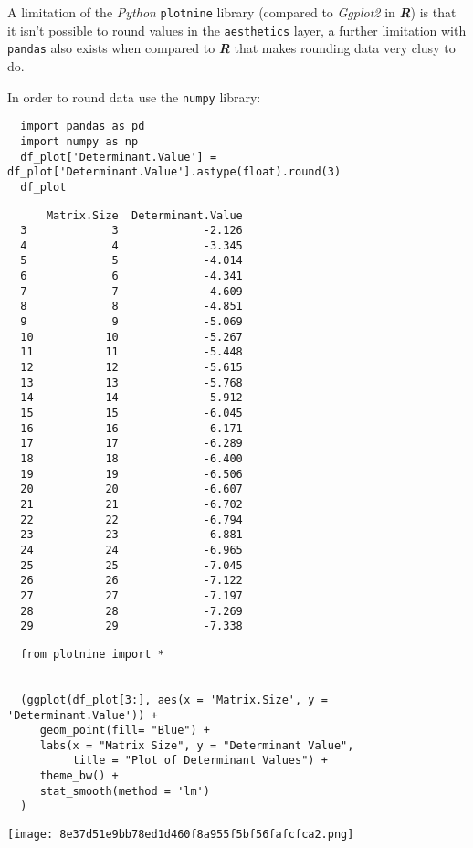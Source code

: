 \documentclass[11pt]{article}
\begin{document}
A limitation of the \emph{Python} \texttt{plotnine} library (compared to \emph{Ggplot2}
in \textbf{\emph{R}}) is that it isn't possible to round values in the \texttt{aesthetics}
layer, a further limitation with \texttt{pandas} also exists when compared to
\textbf{\emph{R}} that makes rounding data very clusy to do.

In order to round data use the \texttt{numpy} library:

\begin{verbatim}
  import pandas as pd
  import numpy as np
  df_plot['Determinant.Value'] = df_plot['Determinant.Value'].astype(float).round(3)
  df_plot
\end{verbatim}

\begin{verbatim}
      Matrix.Size  Determinant.Value
  3             3             -2.126
  4             4             -3.345
  5             5             -4.014
  6             6             -4.341
  7             7             -4.609
  8             8             -4.851
  9             9             -5.069
  10           10             -5.267
  11           11             -5.448
  12           12             -5.615
  13           13             -5.768
  14           14             -5.912
  15           15             -6.045
  16           16             -6.171
  17           17             -6.289
  18           18             -6.400
  19           19             -6.506
  20           20             -6.607
  21           21             -6.702
  22           22             -6.794
  23           23             -6.881
  24           24             -6.965
  25           25             -7.045
  26           26             -7.122
  27           27             -7.197
  28           28             -7.269
  29           29             -7.338
\end{verbatim}

\begin{verbatim}
  from plotnine import *


  (ggplot(df_plot[3:], aes(x = 'Matrix.Size', y = 'Determinant.Value')) +
     geom_point(fill= "Blue") +
     labs(x = "Matrix Size", y = "Determinant Value",
          title = "Plot of Determinant Values") +
     theme_bw() +
     stat_smooth(method = 'lm')
  )
\end{verbatim}

\begin{center}
\texttt{[image: 8e37d51e9bb78ed1d460f8a955f5bf56fafcfca2.png]}
\end{center}
\end{document}

